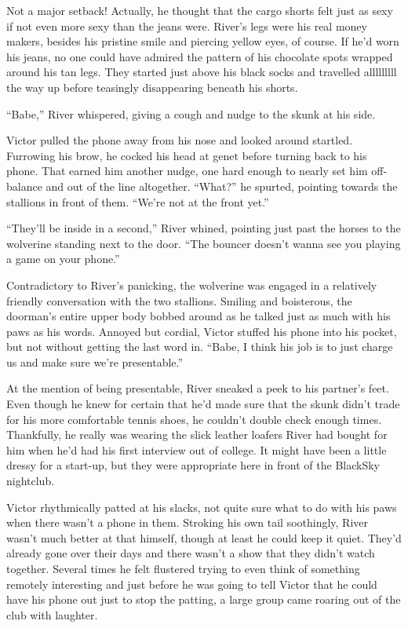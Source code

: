 Not a major setback! Actually, he thought that the cargo shorts felt
just as sexy if not even more sexy than the jeans were. River's legs
were his real money makers, besides his pristine smile and piercing
yellow eyes, of course. If he'd worn his jeans, no one could have
admired the pattern of his chocolate spots wrapped around his tan legs.
They started just above his black socks and travelled alllllllll the way
up before teasingly disappearing beneath his shorts.

``Babe,'' River whispered, giving a cough and nudge to the skunk at his
side.

Victor pulled the phone away from his nose and looked around startled.
Furrowing his brow, he cocked his head at genet before turning back to
his phone. That earned him another nudge, one hard enough to nearly set
him off-balance and out of the line altogether. ``What?'' he spurted,
pointing towards the stallions in front of them. ``We're not at the
front yet.''

``They'll be inside in a second,'' River whined, pointing just past the
horses to the wolverine standing next to the door. ``The bouncer doesn't
wanna see you playing a game on your phone.''

Contradictory to River's panicking, the wolverine was engaged in a
relatively friendly conversation with the two stallions. Smiling and
boisterous, the doorman's entire upper body bobbed around as he talked
just as much with his paws as his words. Annoyed but cordial, Victor
stuffed his phone into his pocket, but not without getting the last word
in. ``Babe, I think his job is to just charge us and make sure we're
presentable.''

At the mention of being presentable, River sneaked a peek to his
partner's feet. Even though he knew for certain that he'd made sure that
the skunk didn't trade for his more comfortable tennis shoes, he
couldn't double check enough times. Thankfully, he really was wearing
the slick leather loafers River had bought for him when he'd had his
first interview out of college. It might have been a little dressy for a
start-up, but they were appropriate here in front of the BlackSky
nightclub.

Victor rhythmically patted at his slacks, not quite sure what to do with
his paws when there wasn't a phone in them. Stroking his own tail
soothingly, River wasn't much better at that himself, though at least he
could keep it quiet. They'd already gone over their days and there
wasn't a show that they didn't watch together. Several times he felt
flustered trying to even think of something remotely interesting and
just before he was going to tell Victor that he could have his phone out
just to stop the patting, a large group came roaring out of the club
with laughter.

